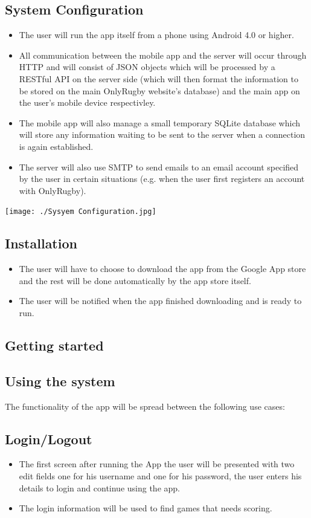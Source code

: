 \documentclass[hidelinks,a4paper,12pt]{article}
\begin{document}
\subsection{System Configuration}
\begin {itemize}
	\item The user will run the app itself from a phone using Android 4.0 or higher.
	\item All communication between the mobile app and the server will occur through HTTP and will consist of JSON objects which will be processed by a RESTful API on the server side (which will then format the information to be stored on the main OnlyRugby website's database) and the main app on the user's mobile device respectivley.
	\item The mobile app will also manage a small temporary SQLite database which will store any information waiting to be sent to the server when a connection is again established.
	\item The server will also use SMTP to send emails to an email account specified by the user in certain situations (e.g. when the user first registers an account with OnlyRugby). 
\end{itemize}
\begin{center}
  	 \texttt{[image: ./Sysyem Configuration.jpg]}\\[0.4cm]
\end{center}
\subsection{Installation}
\begin {itemize}
	\item The user will have to choose to download the app from the Google App store and the rest will be done automatically by the app store itself.
	\item The user will be notified when the app finished downloading and is ready to run.
\end{itemize}

\subsection{Getting started}
	
\subsection{Using the system}
The functionality of the app will be spread between the following use cases:
	\subsection{Login/Logout}
		\begin {itemize}
			\item The first screen after running the App the user will be presented with two edit fields one for his username and one for his password, the user enters his details to login and continue using the app.
			\item The login information will be used to find games that needs scoring.
		\end{itemize}
\end{document}
